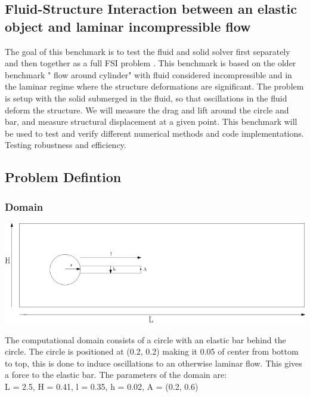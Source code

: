 \subsection{Fluid-Structure Interaction between an elastic object and laminar incompressible flow} \label{sec:HronTurek}
The goal of this benchmark is to test the fluid and solid solver first separately and then together as a full FSI problem \cite{Hron2006a}. This benchmark is based on the older benchmark " flow around cylinder" with fluid considered incompressible and in the laminar regime where the structure deformations are significant. The problem is setup with the solid submerged in the fluid, so that oscillations in the fluid deform the structure. We will measure the drag and lift around the circle and bar, and measure structural displacement at a given point. This benchmark will be used to test and verify different numerical methods and code implementations. Testing robustness and efficiency. 


\subsection*{Problem Defintion}
\subsubsection*{Domain}

\begin{center}
\includegraphics[scale=0.4]{./Verification_Validation/Hron_Turek/Domain_drawing.png}
\end{center}

The computational domain consists of a circle with an elastic bar behind the circle. The circle is positioned at (0.2, 0.2) making it 0.05 of center from bottom to top, this is done to induce oscillations to an otherwise laminar flow. 
This gives a force to the elastic bar. The parameters of the domain are:\\
L = 2.5, H = 0.41, l = 0.35, h = 0.02, A = (0.2, 0.6) \\

